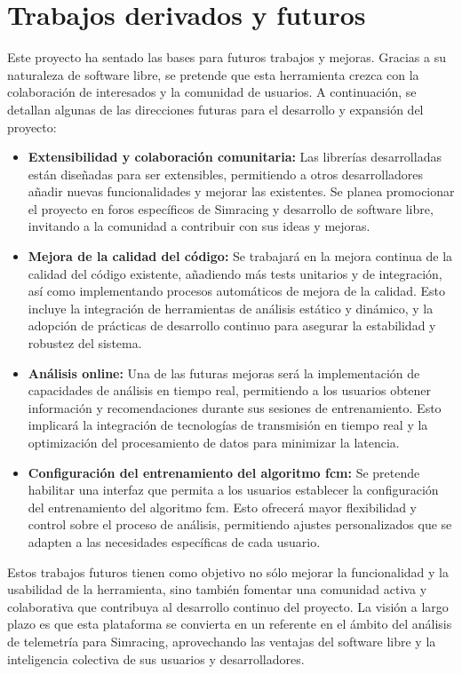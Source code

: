 \section{Trabajos derivados y futuros}
Este proyecto ha sentado las bases para futuros trabajos y mejoras. Gracias a su naturaleza de software libre, se pretende que esta herramienta crezca con la colaboración de interesados y la comunidad de usuarios. A continuación, se detallan algunas de las direcciones futuras para el desarrollo y expansión del proyecto:

\begin{itemize}
    \item \textbf{Extensibilidad y colaboración comunitaria:} Las librerías desarrolladas están diseñadas para ser extensibles, permitiendo a otros desarrolladores añadir nuevas funcionalidades y mejorar las existentes. Se planea promocionar el proyecto en foros específicos de Simracing y desarrollo de software libre, invitando a la comunidad a contribuir con sus ideas y mejoras.
    
    \item \textbf{Mejora de la calidad del código:} Se trabajará en la mejora continua de la calidad del código existente, añadiendo más tests unitarios y de integración, así como implementando procesos automáticos de mejora de la calidad. Esto incluye la integración de herramientas de análisis estático y dinámico, y la adopción de prácticas de desarrollo continuo para asegurar la estabilidad y robustez del sistema.
    
    \item \textbf{Análisis online:} Una de las futuras mejoras será la implementación de capacidades de análisis en tiempo real, permitiendo a los usuarios obtener información y recomendaciones durante sus sesiones de entrenamiento. Esto implicará la integración de tecnologías de transmisión en tiempo real y la optimización del procesamiento de datos para minimizar la latencia.
    
    \item \textbf{Configuración del entrenamiento del algoritmo \ac{fcm}:} Se pretende habilitar una interfaz que permita a los usuarios establecer la configuración del entrenamiento del algoritmo \ac{fcm}. Esto ofrecerá mayor flexibilidad y control sobre el proceso de análisis, permitiendo ajustes personalizados que se adapten a las necesidades específicas de cada usuario.
\end{itemize}

Estos trabajos futuros tienen como objetivo no sólo mejorar la funcionalidad y la usabilidad de la herramienta, sino también fomentar una comunidad activa y colaborativa que contribuya al desarrollo continuo del proyecto. La visión a largo plazo es que esta plataforma se convierta en un referente en el ámbito del análisis de telemetría para Simracing, aprovechando las ventajas del software libre y la inteligencia colectiva de sus usuarios y desarrolladores.


